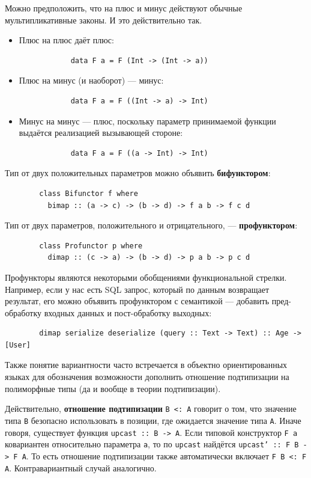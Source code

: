 \documentclass[12pt]{article}
\newcommand{\vocab}[1]{\textbf{#1}} %
\begin{document}
    Можно предположить, что на плюс и минус действуют обычные мультипликативные законы.
    И это действительно так.
    \begin{itemize}
        \item Плюс на плюс даёт плюс:
        \begin{verbatim}
            data F a = F (Int -> (Int -> a))
        \end{verbatim}
        \item Плюс на минус (и наоборот) --- минус:
        \begin{verbatim}
            data F a = F ((Int -> a) -> Int)
        \end{verbatim}
        \item Минус на минус --- плюс, поскольку параметр принимаемой функции выдаётся реализацией вызывающей стороне:
        \begin{verbatim}
            data F a = F ((a -> Int) -> Int)
        \end{verbatim}
    \end{itemize}

    Тип от двух положительных параметров можно объявить \vocab{бифунктором}:
    \begin{verbatim}
        class Bifunctor f where
          bimap :: (a -> c) -> (b -> d) -> f a b -> f c d
    \end{verbatim}

    Тип от двух параметров, положительного и отрицательного, --- \vocab{профунктором}:
    \begin{verbatim}
        class Profunctor p where
          dimap :: (c -> a) -> (b -> d) -> p a b -> p c d
    \end{verbatim}

    Профункторы являются некоторыми обобщениями функциональной стрелки.
    Например, если у нас есть SQL запрос, который по данным возвращает результат, его можно объявить профунктором с семантикой --- добавить пред-обработку входных данных и пост-обработку выходных:
    \begin{verbatim}
        dimap serialize deserialize (query :: Text -> Text) :: Age -> [User]
    \end{verbatim}

    Также понятие вариантности часто встречается в объектно ориентированных языках для обозначения возможности дополнить отношение подтипизации на полиморфные типы (да и вообще в теории подтипизации).

    Действительно, \vocab{отношение подтипизации} \texttt{B <: A} говорит о том, что значение типа \texttt{B} безопасно использовать в позиции, где ожидается значение типа \texttt{A}.
    Иначе говоря, существует функция \texttt{upcast :: B -> A}.
    Если типовой конструктор \texttt{F a} ковариантен относительно параметра \texttt{a}, то по \texttt{upcast} найдётся \texttt{upcast' :: F B -> F A}.
    То есть отношение подтипизации также автоматически включает \texttt{F B <: F A}.
    Контравариантный случай аналогично.
\end{document}
